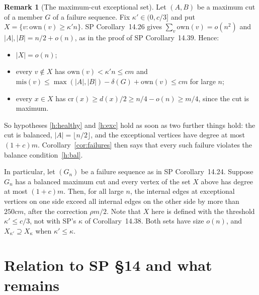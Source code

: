 \documentclass[11pt]{article}
\theoremstyle{definition}
\newtheorem{remark}[theorem]{Remark}
\newcommand{\own}{\mathrm{own}}
\newcommand{\cro}{\mathrm{cr}}
\newcommand{\mis}{\mathrm{mis}}
\begin{document}
\begin{remark}[The maximum-cut exceptional set]\label{rem:maxcut}
Let $(A,B)$ be a maximum cut of a member $G$ of a failure sequence. Fix $\kappa'\in(0,c/3]$ and put $X=\{v:\own(v)\ge\kappa'n\}$. SP Corollary~14.26 gives $\sum_v\own(v)=o(n^2)$ and $|A|,|B|=n/2+o(n)$, as in the proof of SP Corollary~14.39. Hence:
\begin{itemize}[nosep]
\item $|X|=o(n)$;
\item every $v\notin X$ has $\own(v)<\kappa'n\le cm$ and $\mis(v)\le\max(|A|,|B|)-\delta(G)+\own(v)\le cm$ for large $n$;
\item every $x\in X$ has $\cro(x)\ge d(x)/2\ge n/4-o(n)\ge m/4$, since the cut is maximum.
\end{itemize}
So hypotheses \ref{h:healthy} and \ref{h:exc} hold as soon as two further things hold: the cut is balanced, $|A|=\lfloor n/2\rfloor$, and the exceptional vertices have degree at most $(1+c)m$. Corollary~\ref{cor:failures} then says that every such failure violates the balance condition~\ref{h:bal}.

In particular, let $(G_n)$ be a failure sequence as in SP Corollary~14.24. Suppose $G_n$ has a balanced maximum cut and every vertex of the set $X$ above has degree at most $(1+c)m$. Then, for all large $n$, the internal edges at exceptional vertices on one side exceed all internal edges on the other side by more than $250cm$, after the correction $\rho m/2$. Note that $X$ here is defined with the threshold $\kappa'\le c/3$, not with SP's $\kappa$ of Corollary~14.38. Both sets have size $o(n)$, and $X_{\kappa'}\supseteq X_\kappa$ when $\kappa'\le\kappa$.
\end{remark}

\section{Relation to SP \S14 and what remains}\label{sec:sp}
\end{document}
